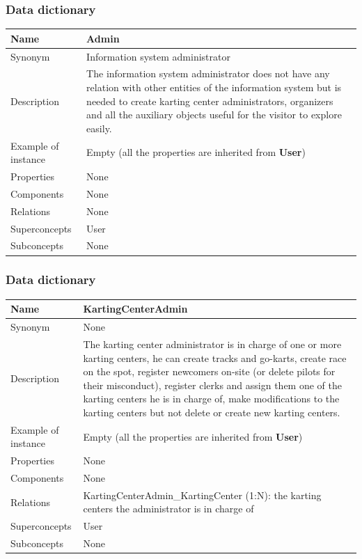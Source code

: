 \documentclass{beamer}
\begin{document}
\begin{frame}
    \frametitle{Data dictionary}
    \begin{table}
    \tiny
    \begin{tabular}{|p{2cm}|p{6cm}|}
    \hline
    Name & \textbf{Admin} \\
    \hline
    Synonym & Information system administrator \\
    \hline
    Description & The information system administrator does not have any relation with other 
    entities of the information system but is needed to create karting center administrators,
    organizers and all the auxiliary objects useful for the visitor to explore easily. \\
    \hline
    Example of instance & Empty (all the properties are inherited from \textbf{User}) \\
    \hline
    Properties & None \\
    \hline
    Components & None \\
    \hline
    Relations & None \\
    \hline
    Superconcepts & User \\
    \hline
    Subconcepts & None \\
    \hline
    \end{tabular}
    \end{table}
\end{frame}

\begin{frame}
    \frametitle{Data dictionary}
    \begin{table}
    \tiny
    \begin{tabular}{|p{2cm}|p{6cm}|}
    \hline
    Name & \textbf{KartingCenterAdmin} \\
    \hline
    Synonym & None \\
    \hline
    Description & The karting center administrator is in charge of one or more 
    karting centers, he can create tracks and go-karts, create race on the spot,
    register newcomers on-site (or delete pilots for their misconduct), 
    register clerks and assign them one of the karting centers he is in charge of,
    make modifications to the karting centers but not 
    delete or create new karting centers. \\
    \hline
    Example of instance & Empty (all the properties are inherited from \textbf{User}) \\
    \hline
    Properties & None \\
    \hline
    Components & None \\
    \hline
    Relations &
    KartingCenterAdmin\_KartingCenter (1:N): the karting centers the administrator is in charge of \\
    \hline
    Superconcepts & User \\
    \hline
    Subconcepts & None \\
    \hline
    \end{tabular}
    \end{table}
\end{frame}
\end{document}
